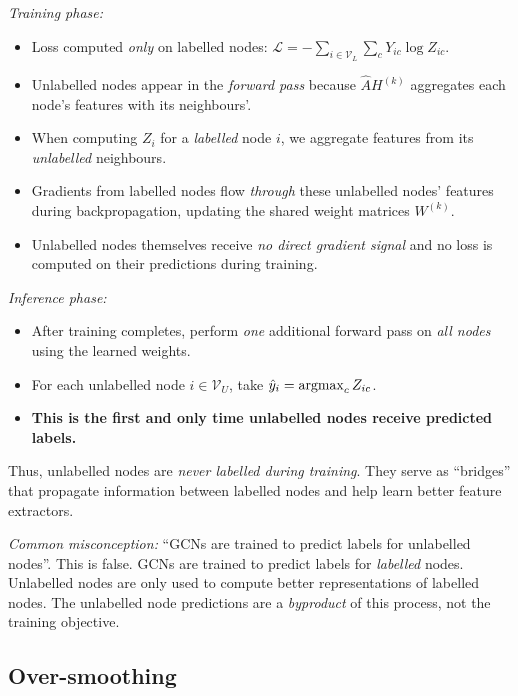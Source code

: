 \begin{notechapter}
\begin{keyidea}
\emph{Training phase:}
\begin{itemize}
    \item Loss computed \emph{only} on labelled nodes:
          $\mathcal{L} = -\sum_{i \in \mathcal{V}_L}\sum_c Y_{ic}\log Z_{ic}$.
    \item Unlabelled nodes appear in the \emph{forward pass} because
          $\hat{A}H^{(k)}$ aggregates each node's features with its neighbours'.
    \item When computing $Z_i$ for a \emph{labelled} node $i$, we aggregate
          features from its \emph{unlabelled} neighbours.
    \item Gradients from labelled nodes flow \emph{through} these unlabelled
          nodes' features during backpropagation, updating the shared weight
          matrices $W^{(k)}$.
    \item Unlabelled nodes themselves receive \emph{no direct gradient signal}
          and no loss is computed on their predictions during training.
\end{itemize}

\emph{Inference phase:}
\begin{itemize}
    \item After training completes, perform \emph{one} additional forward pass on
          \emph{all nodes} using the learned weights.
    \item For each unlabelled node $i \in \mathcal{V}_U$, take
          $\hat{y}_i = \operatorname*{argmax}_c Z_{ic}$.
    \item \textbf{This is the first and only time unlabelled nodes receive
          predicted labels.}
\end{itemize}

Thus, unlabelled nodes are \emph{never labelled during training}. They serve as
``bridges'' that propagate information between labelled nodes and help learn
better feature extractors.
\end{keyidea}

\begin{pitfall}
\emph{Common misconception:} ``GCNs are trained to predict labels for unlabelled
nodes''. This is false. GCNs are trained to predict labels for \emph{labelled}
nodes. Unlabelled nodes are only used to compute better representations of
labelled nodes. The unlabelled node predictions are a \emph{byproduct} of this
process, not the training objective.
\end{pitfall}

\subsection{Over-smoothing}


\end{notechapter}
